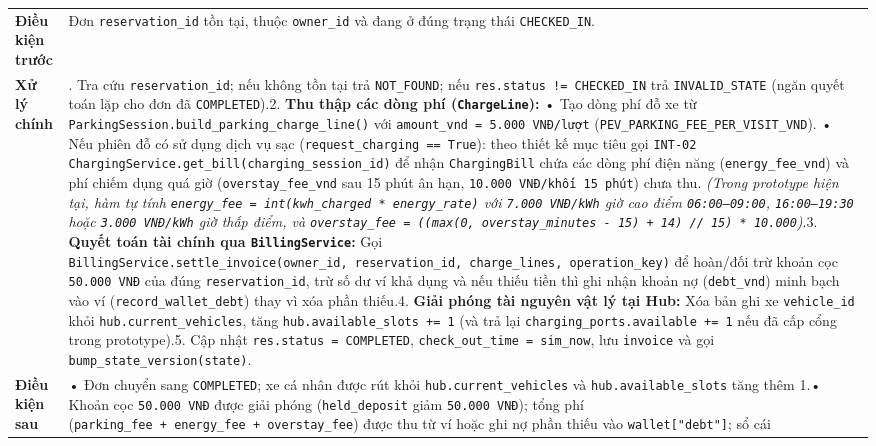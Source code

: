 \documentclass[11pt,a4paper]{article}
\begin{document}
\begin{longtable}[]{@{}
  >{\raggedright\arraybackslash}p{}
  >{\raggedright\arraybackslash}p{}@{}}
\textbf{Điều kiện trước} & Đơn \texttt{reservation\_id} tồn tại, thuộc
\texttt{owner\_id} và đang ở đúng trạng thái \texttt{CHECKED\_IN}. \\
\textbf{Xử lý chính} & 1. Tra cứu \texttt{reservation\_id}; nếu không
tồn tại trả \texttt{NOT\_FOUND}; nếu
\texttt{res.status\ !=\ CHECKED\_IN} trả \texttt{INVALID\_STATE} (ngăn
quyết toán lặp cho đơn đã \texttt{COMPLETED}).2. \textbf{Thu thập các
dòng phí (\texttt{ChargeLine}):} • Tạo dòng phí đỗ xe từ
\texttt{ParkingSession.build\_parking\_charge\_line()} với
\texttt{amount\_vnd\ =\ 5.000\ VNĐ/lượt}
(\texttt{PEV\_PARKING\_FEE\_PER\_VISIT\_VND}). • Nếu phiên đỗ có sử dụng
dịch vụ sạc (\texttt{request\_charging\ ==\ True}): theo thiết kế mục
tiêu gọi \texttt{INT-02}
\texttt{ChargingService.get\_bill(charging\_session\_id)} để nhận
\texttt{ChargingBill} chứa các dòng phí điện năng
(\texttt{energy\_fee\_vnd}) và phí chiếm dụng quá giờ
(\texttt{overstay\_fee\_vnd} sau 15 phút ân hạn,
\texttt{10.000\ VNĐ/khối\ 15\ phút}) chưa thu. \emph{(Trong prototype
hiện tại, hàm tự tính
\texttt{energy\_fee\ =\ int(kwh\_charged\ *\ energy\_rate)} với
\texttt{7.000\ VNĐ/kWh} giờ cao điểm \texttt{06:00–09:00},
\texttt{16:00–19:30} hoặc \texttt{3.000\ VNĐ/kWh} giờ thấp điểm, và
\texttt{overstay\_fee\ =\ ((max(0,\ overstay\_minutes\ -\ 15)\ +\ 14)\ //\ 15)\ *\ 10.000})}.3.
\textbf{Quyết toán tài chính qua \texttt{BillingService}:} Gọi
\texttt{BillingService.settle\_invoice(owner\_id,\ reservation\_id,\ charge\_lines,\ operation\_key)}
để hoàn/đối trừ khoản cọc \texttt{50.000\ VNĐ} của đúng
\texttt{reservation\_id}, trừ số dư ví khả dụng và nếu thiếu tiền thì
ghi nhận khoản nợ (\texttt{debt\_vnd}) minh bạch vào ví
(\texttt{record\_wallet\_debt}) thay vì xóa phần thiếu.4. \textbf{Giải
phóng tài nguyên vật lý tại Hub:} Xóa bản ghi xe \texttt{vehicle\_id}
khỏi \texttt{hub.current\_vehicles}, tăng
\texttt{hub.available\_slots\ +=\ 1} (và trả lại
\texttt{charging\_ports.available\ +=\ 1} nếu đã cấp cổng trong
prototype).5. Cập nhật \texttt{res.status\ =\ COMPLETED},
\texttt{check\_out\_time\ =\ sim\_now}, lưu \texttt{invoice} và gọi
\texttt{bump\_state\_version(state)}. \\
\textbf{Điều kiện sau} & • Đơn chuyển sang \texttt{COMPLETED}; xe cá
nhân được rút khỏi \texttt{hub.current\_vehicles} và
\texttt{hub.available\_slots} tăng thêm 1.• Khoản cọc
\texttt{50.000\ VNĐ} được giải phóng (\texttt{held\_deposit} giảm
\texttt{50.000\ VNĐ}); tổng phí
(\texttt{parking\_fee\ +\ energy\_fee\ +\ overstay\_fee}) được thu từ ví
hoặc ghi nợ phần thiếu vào \texttt{wallet{[}"debt"{]}}; sổ cái

\end{longtable}
\end{document}
